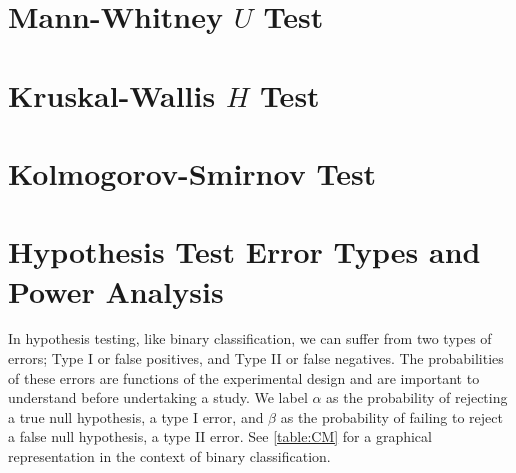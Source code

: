 \section{Mann-Whitney \texorpdfstring{$U$}{U} Test}
\label{hypo:mann_whitney_U_test}

\section{Kruskal-Wallis \texorpdfstring{$H$}{H} Test}
\label{hypo:kruskal_wallis_H_test}

\section{Kolmogorov-Smirnov Test}
\label{hypo:KS_test}

\section{Hypothesis Test Error Types and Power Analysis}
\label{hypo:power}

In hypothesis testing, like binary classification, we can suffer from two types of errors;
Type I or false positives, and Type II or false negatives.
The probabilities of these errors are functions of the experimental design
and are important to understand before undertaking a study.
We label $\alpha$ as the probability of rejecting a true null hypothesis, \ie a type I error,
and $\beta$ as the probability of failing to reject a false null hypothesis, \ie a type II error.
See \cref{table:CM} for a graphical representation in the context of binary classification.

